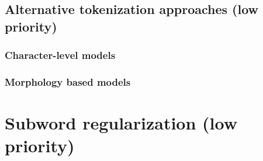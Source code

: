











\subsection{Alternative tokenization approaches (low priority)}

\subsubsection{Character-level models}
\subsubsection{Morphology based models}

\section{Subword regularization (low priority)}

